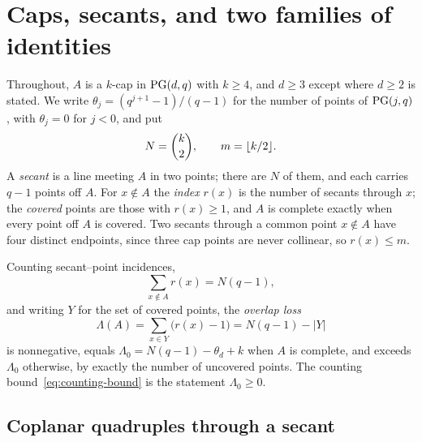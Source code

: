 \section{Caps, secants, and two families of identities}
\label{sec:preliminaries}

Throughout, \(A\) is a \(k\)-cap in \(\mathrm{PG}(d,q)\) with \(k\ge4\), and
\(d\ge3\) except where \(d\ge2\) is stated.  We write
\(\theta_j=(q^{j+1}-1)/(q-1)\) for the number of points of \(\mathrm{PG}(j,q)\),
with \(\theta_j=0\) for \(j<0\), and put
\[
 N=\binom{k}{2},\qquad m=\lfloor k/2\rfloor .
\]
A \emph{secant} is a line meeting \(A\) in two points; there are \(N\) of
them, and each carries \(q-1\) points off \(A\).  For \(x\notin A\) the
\emph{index} \(r(x)\) is the number of secants through \(x\); the
\emph{covered} points are those with \(r(x)\ge1\), and \(A\) is complete
exactly when every point off \(A\) is covered.  Two secants through a
common point \(x\notin A\) have four distinct endpoints, since three cap
points are never collinear, so \(r(x)\le m\).

Counting secant--point incidences,
\begin{equation}
 \sum_{x\notin A}r(x)=N(q-1),
\label{eq:first-moment}
\end{equation}
and writing \(Y\) for the set of covered points, the \emph{overlap loss}
\begin{equation}
 \Lambda(A)=\sum_{x\in Y}\bigl(r(x)-1\bigr)=N(q-1)-|Y|
\label{eq:overlap-loss}
\end{equation}
is nonnegative, equals \(\Lambda_0=N(q-1)-\theta_d+k\) when \(A\) is
complete, and exceeds \(\Lambda_0\) otherwise, by exactly the number of
uncovered points.  The counting bound~\eqref{eq:counting-bound} is the
statement \(\Lambda_0\ge0\).

\subsection{Coplanar quadruples through a secant}

